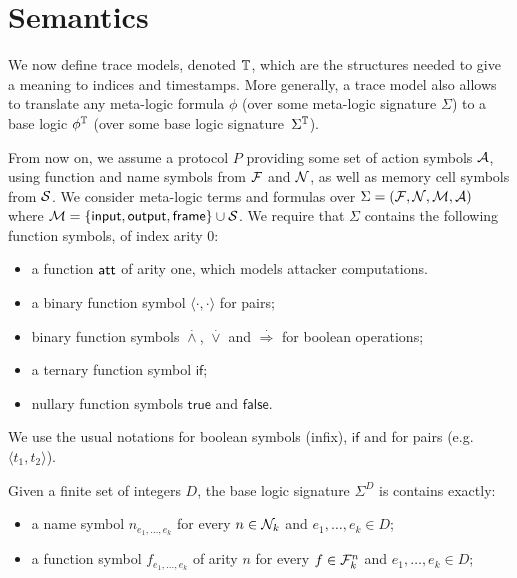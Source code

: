 \section{Semantics}

We now define trace models, denoted $\mathbb{T}$, which are the structures needed to
give a meaning to indices and timestamps. More generally, a trace model
also allows to translate any meta-logic formula $\phi$
(over some meta-logic signature $\Sigma$)
to a base logic $\phi^{\mathbb{T}}$ (over some base logic signature~$\Sigma^{\mathbb{T}}$).

\medskip

From now on, we assume a protocol $P$ providing some set of action
symbols $\mathcal{A}$, using function and name symbols from $\mathcal{F}$ and $\mathcal{N}$,
as well as memory cell symbols from $\mathcal{S}$.
We consider meta-logic terms and formulas over $\Sigma = (\mathcal{F},\mathcal{N},\mathcal{M},\mathcal{A})$
where $\mathcal{M} = \{ \textsf{input}, \textsf{output}, \textsf{frame} \} \cup \mathcal{S}$. We require that $\Sigma$ contains the following function symbols, of index arity $0$:
\begin{itemize}
\item a function $\mathsf{att}$ of arity one, which models attacker computations.
\item a binary function symbol $\langle \cdot , \cdot \rangle$ for pairs;
\item binary function symbols
  $\stackrel{.}{\wedge}$, $\stackrel{.}{\vee}$ and
  $\stackrel{.}{\Rightarrow}$ for boolean operations;
\item a ternary function symbol $\mathsf{if}$;
\item nullary function symbols $\mathsf{true}$ and $\mathsf{false}$.
\end{itemize}
We use the usual notations for boolean symbols (infix), $\mathsf{if}$ and for pairs (e.g.\ $\langle t_1,t_2 \rangle$).

\begin{definition}
  Given a finite set of integers $D$, the base logic
  signature $\Sigma^D$ is contains exactly:
  \begin{itemize}
    \item a name symbol $n_{e_1,\ldots,e_k}$ for every $n \in \mathcal{N}_k$
       and $e_1,\ldots,e_k \in D$;
    \item a function symbol $f_{e_1,\ldots,e_k}$ of arity $n$ for every
      $f \in \mathcal{F}_k^n$ and $e_1,\ldots,e_k \in D$;
  \end{itemize}
\end{definition}

